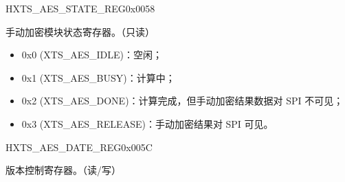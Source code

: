 \begin{register}{H}{XTS\_AES\_STATE\_REG}{0x0058}\label{regdesc:XTSAESSTATEREG}
%
%
\regnewline%
\begin{regdesc}\begin{reglist}
\item [XTS\_AES\_STATE] 手动加密模块状态寄存器。（只读）
    \begin{itemize}
        \item 0x0 (XTS\_AES\_IDLE)：空闲；
        \item 0x1 (XTS\_AES\_BUSY)：计算中；
        \item 0x2 (XTS\_AES\_DONE)：计算完成，但手动加密结果数据对 SPI 不可见；
        \item 0x3 (XTS\_AES\_RELEASE)：手动加密结果对 SPI 可见。
    \end{itemize}
\end{reglist}\end{regdesc}
\end{register}


\begin{register}{H}{XTS\_AES\_DATE\_REG}{0x005C}\label{regdesc:XTSAESDATEREG}
%
%
\regnewline%
\begin{regdesc}\begin{reglist}
\item [XTS\_AES\_DATE] 版本控制寄存器。（读/写）
\end{reglist}\end{regdesc}
\end{register}

